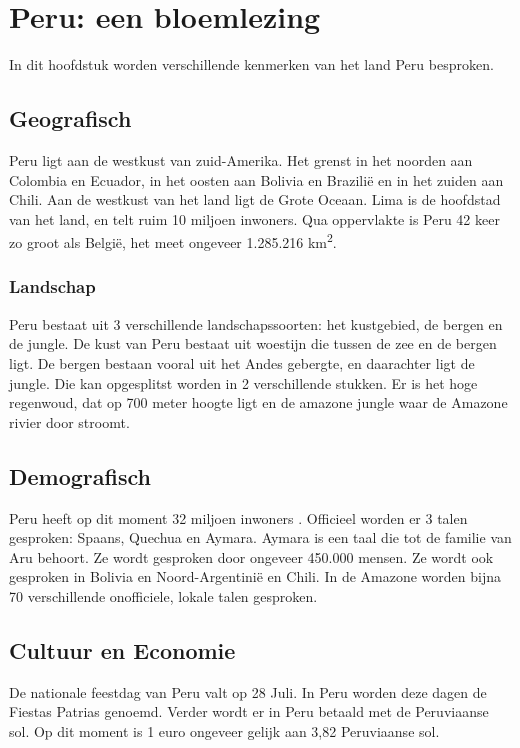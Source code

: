 \section{Peru: een bloemlezing}
In dit hoofdstuk worden verschillende kenmerken van het land Peru besproken. 
\subsection{Geografisch}
Peru ligt aan de westkust van zuid-Amerika. Het grenst in het noorden aan Colombia en Ecuador, in het oosten aan Bolivia en Brazilië en in het zuiden aan Chili. Aan de westkust van het land ligt de Grote Oceaan. Lima is de hoofdstad van het land, en telt ruim 10 miljoen inwoners. Qua oppervlakte is Peru 42 keer zo groot als België, het meet ongeveer 1.285.216 km\textsuperscript{2}. 

\subsubsection{Landschap}
Peru bestaat uit 3 verschillende landschapssoorten: het kustgebied, de bergen en de jungle. De kust van Peru bestaat uit woestijn die tussen de zee en de bergen ligt. De bergen bestaan vooral uit het Andes gebergte, en daarachter ligt de jungle. Die kan opgesplitst worden in 2 verschillende stukken. Er is het hoge regenwoud, dat op 700 meter hoogte ligt en de amazone jungle waar de Amazone rivier door stroomt. \autocite{ToPeru2020}

\subsection{Demografisch}
Peru heeft op dit moment 32 miljoen inwoners \autocite{Overheid2020}. Officieel worden er 3 talen gesproken: Spaans, Quechua en Aymara. Aymara is een taal die tot de familie van Aru behoort. Ze wordt gesproken door ongeveer 450.000 mensen. \autocite{CulturaPeru2020} Ze wordt ook gesproken in Bolivia en Noord-Argentinië en Chili. In de Amazone worden bijna 70 verschillende onofficiele, lokale talen gesproken. \autocite{dosmanosperu}

\subsection{Cultuur en Economie}
De nationale feestdag van Peru valt op 28 Juli. In Peru worden deze dagen de Fiestas Patrias genoemd. \autocite{dosmanosperu2018}  Verder wordt er in Peru betaald met de Peruviaanse sol. Op dit moment is 1 euro ongeveer gelijk aan 3,82 Peruviaanse sol.

